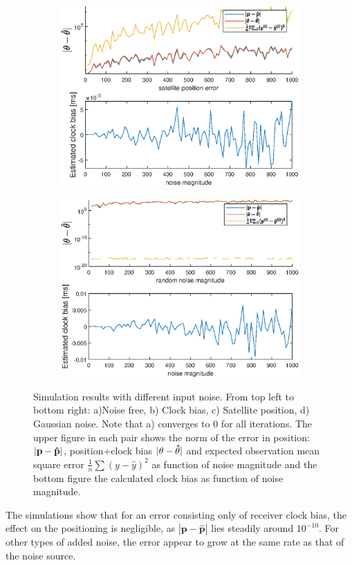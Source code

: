\begin{figure}[!h]
\begin{subfigure}{0.49\textwidth}
  \includegraphics[width=\linewidth]{Results/SimulationEstPos/satPos}  
\end{subfigure}
\medskip
\begin{subfigure}{0.49\textwidth}
  \includegraphics[width=\linewidth]{Results/SimulationEstPos/Gaussian}
\end{subfigure}
\caption{Simulation results with different input noise. From top left to bottom right: a)Noise free, b) Clock bias, c) Satellite position, d) Gaussian noise. Note that a) converges to 0 for all iterations. The upper figure in each pair shows the norm of the error in position: $|\bf p-\hat{p}|$, position+clock bias $|\bf \theta-\hat{\theta}|$ and expected observation mean square error $\frac{1}{n}\sum(y-\hat{y})^2$ as function of noise magnitude and the bottom figure the calculated clock bias as function of noise magnitude.}
\label{fig:sim_est_pos}
\end{figure}
\par
The simulations show that for an error consisting only of receiver clock bias, the effect on the positioning is negligible, as $|\textbf{p}-\hat{\textbf{p}}|$ lies steadily around $10^{-10}$. For other types of added noise, the error appear to grow at the same rate as that of the noise source.

